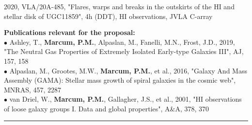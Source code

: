 2020, VLA/20A-485, "Flares, warps and breaks in the outskirts of the HI and stellar disk of UGC11859", 4h (DDT), HI observations, JVLA C-array
\par \vspace{-0.5em}
\textbf{Publications relevant for the proposal:}\\
{\scriptsize{$\bullet$}} Ashley, T., \textbf{Marcum, P.M.}, Alpaslan, M., Fanelli, M.N., Frost, J.D., 2019, "The Neutral Gas Properties of Extremely Isolated Early-type Galaxies III", AJ, 157, 158\\
{\scriptsize{$\bullet$}} Alpaslan, M., Grootes, M.W., \textbf{Marcum, P.M.}, et al., 2016, "Galaxy And Mass Assembly (GAMA): Stellar mass growth of spiral galaxies in the cosmic web", MNRAS, 457, 2287\\
{\scriptsize{$\bullet$}} van Driel, W., \textbf{Marcum, P.M.}, Gallagher, J.S., et al., 2001, "HI observations of loose galaxy groups I. Data and global properties", A\&A, 378, 370
\medskip \hrule \vspace{5pt} \medskip